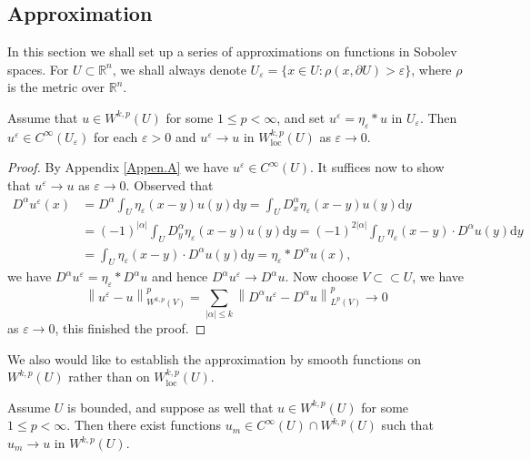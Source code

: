 \subsection{Approximation}\label{Sec4.3}
In this section we shall set up a series of approximations on functions in Sobolev spaces. For $U\subset\mathbb{R}^n$, we shall always denote $U_\varepsilon=\{x\in U:\rho(x,\partial U)>\varepsilon\}$, where $\rho$ is the metric over $\mathbb{R}^n$.
\begin{theorem}
Assume that $u\in W^{k,p}(U)$ for some $1\le p<\infty$, and set $u^\varepsilon=\eta_\varepsilon*u$ in $U_\varepsilon$. Then $u^\varepsilon\in C^\infty(U_\varepsilon)$ for each $\varepsilon>0$ and $u^\varepsilon\to u$ in $W_{\mathrm{loc}}^{k,p}(U)$ as $\varepsilon\to 0$.
\end{theorem}
\begin{proof}
By Appendix \ref{Appen.A} we have $u^\varepsilon\in C^\infty(U)$. It suffices now to show that $u^\varepsilon\to u$ as $\varepsilon\to 0$. Observed that 
$$
\begin{aligned}
D^{\alpha}u^{\varepsilon}\left( x \right) &=D^{\alpha}\int_U{\eta _{\varepsilon}\left( x-y \right) u\left( y \right) \mathrm{d}y}=\int_U{D_{x}^{\alpha}\eta _{\varepsilon}\left( x-y \right) u\left( y \right) \mathrm{d}y}
\\
&=\left( -1 \right) ^{\left| \alpha \right|}\int_U{D_{y}^{\alpha}\eta _{\varepsilon}\left( x-y \right) u\left( y \right) \mathrm{d}y}=\left( -1 \right) ^{2\left| \alpha \right|}\int_U{\eta _{\varepsilon}\left( x-y \right) \cdot D^{\alpha}u\left( y \right) \mathrm{d}y}
\\
&=\int_U{\eta _{\varepsilon}\left( x-y \right) \cdot D^{\alpha}u\left( y \right) \mathrm{d}y}=\eta _{\varepsilon}*D^{\alpha}u\left( x \right) ,
\end{aligned}
$$
we have $D^\alpha u^\varepsilon=\eta_\varepsilon*D^\alpha u$ and hence $D^\alpha u^\varepsilon\to D^\alpha u$. Now choose $V\subset\subset U$, we have 
$$
\left\| u^{\varepsilon}-u \right\| _{W^{k,p}\left( V \right)}^{p}=\sum_{\left| \alpha \right|\le k}{\left\| D^{\alpha}u^{\varepsilon}-D^{\alpha}u \right\| _{L^p\left( V \right)}^{p}}\rightarrow 0
$$
as $\varepsilon\to 0$, this finished the proof.
\end{proof}
We also would like to establish the approximation by smooth functions on $W^{k,p}(U)$ rather than on $W_{\mathrm{loc}}^{k,p}(U)$.
\begin{theorem}\label{Thm4.3.2}
Assume $U$ is bounded, and suppose as well that $u\in W^{k,p}(U)$ for some $1\le p<\infty$. Then there exist functions $u_m\in C^\infty(U)\cap W^{k,p}(U)$ such that $u_m\to u$ in $W^{k,p}(U)$.
\end{theorem}
